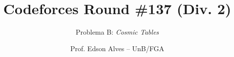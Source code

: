 \title{Codeforces Round \#137 (Div. 2)}
\subtitle{Problema B: \it Cosmic Tables}
\author{Prof. Edson Alves -- UnB/FGA}
\date{}
